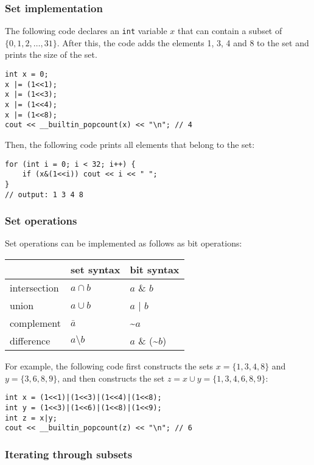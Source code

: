 \subsubsection{Set implementation}

The following code declares an \texttt{int}
variable $x$ that can contain
a subset of $\{0,1,2,\ldots,31\}$.
After this, the code adds the elements 1, 3, 4 and 8
to the set and prints the size of the set.
\begin{lstlisting}
int x = 0;
x |= (1<<1);
x |= (1<<3);
x |= (1<<4);
x |= (1<<8);
cout << __builtin_popcount(x) << "\n"; // 4
\end{lstlisting}
Then, the following code prints all
elements that belong to the set:
\begin{lstlisting}
for (int i = 0; i < 32; i++) {
    if (x&(1<<i)) cout << i << " ";
}
// output: 1 3 4 8
\end{lstlisting}

\subsubsection{Set operations}

Set operations can be implemented as follows as bit operations:

\begin{center}
\begin{tabular}{lll}
& set syntax & bit syntax \\
\hline
intersection & $a \cap b$ & $a$ \& $b$ \\
union & $a \cup b$ & $a$ | $b$ \\
complement & $\bar a$ & \textasciitilde$a$ \\
difference & $a \setminus b$ & $a$ \& (\textasciitilde$b$) \\
\end{tabular}
\end{center}

For example, the following code first constructs
the sets $x=\{1,3,4,8\}$ and $y=\{3,6,8,9\}$,
and then constructs the set $z = x \cup y = \{1,3,4,6,8,9\}$:

\begin{lstlisting}
int x = (1<<1)|(1<<3)|(1<<4)|(1<<8);
int y = (1<<3)|(1<<6)|(1<<8)|(1<<9);
int z = x|y;
cout << __builtin_popcount(z) << "\n"; // 6
\end{lstlisting}

\subsubsection{Iterating through subsets}

